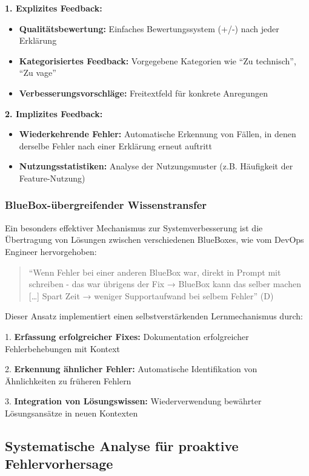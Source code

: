 \documentclass[
  a4paper,
  12pt,
  oneside,
  open=any,
  BCOR=12mm,
  DIV=14,
  parskip=half*,
  headsepline,
  footsepline,
  pointlessnumbers,
  liststotoc,
  numbers=noenddot,
  listof=totoc]{scrartcl}
\begin{document}
\textbf{1. Explizites Feedback:}

\begin{itemize}
\item
  \textbf{Qualitätsbewertung:} Einfaches Bewertungssystem (+/-) nach
  jeder Erklärung
\item
  \textbf{Kategorisiertes Feedback:} Vorgegebene Kategorien wie ``Zu
  technisch'', ``Zu vage''
\item
  \textbf{Verbesserungsvorschläge:} Freitextfeld für konkrete Anregungen
\end{itemize}

\textbf{2. Implizites Feedback:}

\begin{itemize}
\item
  \textbf{Wiederkehrende Fehler:} Automatische Erkennung von Fällen, in
  denen derselbe Fehler nach einer Erklärung erneut auftritt
\item
  \textbf{Nutzungsstatistiken:} Analyse der Nutzungsmuster (z.B.
  Häufigkeit der Feature-Nutzung)
\end{itemize}

\subsubsection{BlueBox-übergreifender
Wissenstransfer}\label{bluebox-uxfcbergreifender-wissenstransfer}

Ein besonders effektiver Mechanismus zur Systemverbesserung ist die
Übertragung von Lösungen zwischen verschiedenen BlueBoxes, wie vom
DevOps Engineer hervorgehoben:

\begin{quote}
``Wenn Fehler bei einer anderen BlueBox war, direkt in Prompt mit
schreiben - das war übrigens der Fix → BlueBox kann das selber machen
{[}\ldots{]} Spart Zeit → weniger Supportaufwand bei selbem Fehler'' (D)
\end{quote}

Dieser Ansatz implementiert einen selbstverstärkenden Lernmechanismus
durch:

1. \textbf{Erfassung erfolgreicher Fixes:} Dokumentation erfolgreicher
Fehlerbehebungen mit Kontext

2. \textbf{Erkennung ähnlicher Fehler:} Automatische Identifikation von
Ähnlichkeiten zu früheren Fehlern

3. \textbf{Integration von Lösungswissen:} Wiederverwendung bewährter
Lösungsansätze in neuen Kontexten

\subsection{Systematische Analyse für proaktive
Fehlervorhersage}\label{systematische-analyse-fuxfcr-proaktive-fehlervorhersage}
\end{document}
